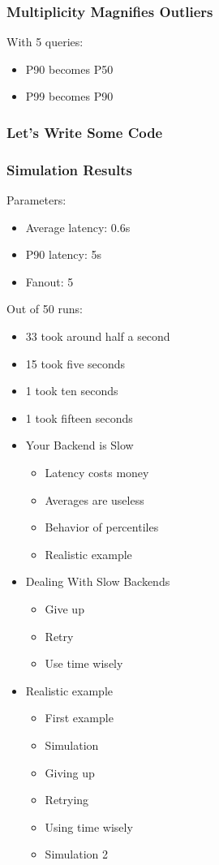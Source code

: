 \begin{frame}
\frametitle{Multiplicity Magnifies Outliers}

With 5 queries:

\begin{itemize}
\item P90 becomes P50
\item P99 becomes P90
\end{itemize}

\end{frame}

\begin{frame}
\frametitle{Let's Write Some Code}



\end{frame}

\begin{frame}
\frametitle{Simulation Results}

Parameters:
\begin{itemize}
\item Average latency: 0.6s
\item P90 latency: 5s
\item Fanout: 5
\end{itemize}

Out of 50 runs:

\begin{itemize}
\item 33 took around half a second
\item 15 took five seconds
\item 1 took ten seconds
\item 1 took fifteen seconds
\end{itemize}
\end{frame}


\begin{itemize}
\item Your Backend is Slow
\begin{itemize}
\item Latency costs money
\item Averages are useless
\item Behavior of percentiles
\item Realistic example
\end{itemize}
\item Dealing With Slow Backends
\begin{itemize}
\item Give up
\item Retry
\item Use time wisely
\end{itemize}
\item Realistic example
\begin{itemize}
\item First example
\item Simulation
\item Giving up
\item Retrying
\item Using time wisely
\item Simulation 2
\end{itemize}
\end{itemize}



